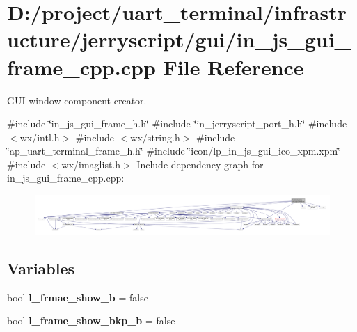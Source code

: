 \section{D\+:/project/uart\+\_\+terminal/infrastructure/jerryscript/gui/in\+\_\+js\+\_\+gui\+\_\+frame\+\_\+cpp.cpp File Reference}
\label{in__js__gui__frame__cpp_8cpp}


G\+UI window component creator.  


{\ttfamily \#include \char`\"{}in\+\_\+js\+\_\+gui\+\_\+frame\+\_\+h.\+h\char`\"{}}\newline
{\ttfamily \#include \char`\"{}in\+\_\+jerryscript\+\_\+port\+\_\+h.\+h\char`\"{}}\newline
{\ttfamily \#include $<$wx/intl.\+h$>$}\newline
{\ttfamily \#include $<$wx/string.\+h$>$}\newline
{\ttfamily \#include \char`\"{}ap\+\_\+uart\+\_\+terminal\+\_\+frame\+\_\+h.\+h\char`\"{}}\newline
{\ttfamily \#include \char`\"{}icon/lp\+\_\+in\+\_\+js\+\_\+gui\+\_\+ico\+\_\+xpm.\+xpm\char`\"{}}\newline
{\ttfamily \#include $<$wx/imaglist.\+h$>$}\newline
Include dependency graph for in\+\_\+js\+\_\+gui\+\_\+frame\+\_\+cpp.\+cpp\+:
\nopagebreak
\begin{figure}[H]
\begin{center}
\leavevmode
\includegraphics[width=350pt]{in__js__gui__frame__cpp_8cpp__incl}
\end{center}
\end{figure}
\subsection*{Variables}
\begin{DoxyCompactItemize}
\item 
bool \textbf{ l\+\_\+frmae\+\_\+show\+\_\+b} = false
\item 
bool {\bfseries l\+\_\+frame\+\_\+show\+\_\+bkp\+\_\+b} = false
\end{DoxyCompactItemize}


